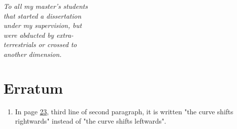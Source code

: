 \documentclass [12pt,a4paper,oneside]{article}
\begin{document}

\thispagestyle{empty}%
\vspace*{\fill} %
\begin{flushright}
\textit{%
To all my master's students\\
that started a dissertation\\
under my supervision, but\\
were abducted by extra-\\
terrestrials or crossed to\\
another dimension.
}
\end{flushright}


	\newpage %
	\thispagestyle{plain}%
	
	\setcounter{page}{1} %

\section*{Erratum}

\begin{enumerate}
\item	In page \hyperlink{page.23}{23}, third line of second paragraph, it is written "the curve shifts rightwards" instead of "the curve shifts leftwards".
\end{enumerate}


	\newpage %
	\thispagestyle{plain}%
	
	

\glsaddall
\printglossaries


	\newpage %
	\thispagestyle{plain}%
	
\end{document}
